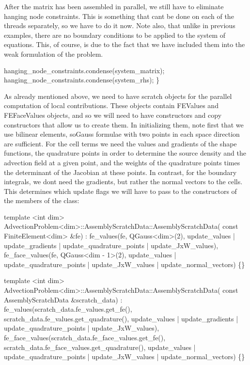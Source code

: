 After the matrix has been assembled in parallel, we still have to eliminate hanging node constraints. This is something that can\textquotesingle{}t be done on each of the threads separately, so we have to do it now. Note also, that unlike in previous examples, there are no boundary conditions to be applied to the system of equations. This, of course, is due to the fact that we have included them into the weak formulation of the problem.


\begin{DoxyCode}
    hanging\_node\_constraints.condense(system\_matrix);
    hanging\_node\_constraints.condense(system\_rhs);
\}
\end{DoxyCode}


As already mentioned above, we need to have scratch objects for the parallel computation of local contributions. These objects contain F\+E\+Values and F\+E\+Face\+Values objects, and so we will need to have constructors and copy constructors that allow us to create them. In initializing them, note first that we use bilinear elements, so\+Gauss formulae with two points in each space direction are sufficient. For the cell terms we need the values and gradients of the shape functions, the quadrature points in order to determine the source density and the advection field at a given point, and the weights of the quadrature points times the determinant of the Jacobian at these points. In contrast, for the boundary integrals, we don\textquotesingle{}t need the gradients, but rather the normal vectors to the cells. This determines which update flags we will have to pass to the constructors of the members of the class\+:


\begin{DoxyCode}
\textcolor{keyword}{template} <\textcolor{keywordtype}{int} dim>
AdvectionProblem<dim>::AssemblyScratchData::AssemblyScratchData(
    \textcolor{keyword}{const} FiniteElement<dim> &fe)
    : fe\_values(fe, QGauss<dim>(2),
                update\_values | update\_gradients | update\_quadrature\_points |
                    update\_JxW\_values),
      fe\_face\_values(fe, QGauss<dim - 1>(2),
                     update\_values | update\_quadrature\_points |
                         update\_JxW\_values | update\_normal\_vectors)
\{\}


\textcolor{keyword}{template} <\textcolor{keywordtype}{int} dim>
AdvectionProblem<dim>::AssemblyScratchData::AssemblyScratchData(
    \textcolor{keyword}{const} AssemblyScratchData &scratch\_data)
    : fe\_values(scratch\_data.fe\_values.get\_fe(),
                scratch\_data.fe\_values.get\_quadrature(),
                update\_values | update\_gradients | update\_quadrature\_points |
                    update\_JxW\_values),
      fe\_face\_values(scratch\_data.fe\_face\_values.get\_fe(),
                     scratch\_data.fe\_face\_values.get\_quadrature(),
                     update\_values | update\_quadrature\_points |
                         update\_JxW\_values | update\_normal\_vectors)
\{\}
\end{DoxyCode}


